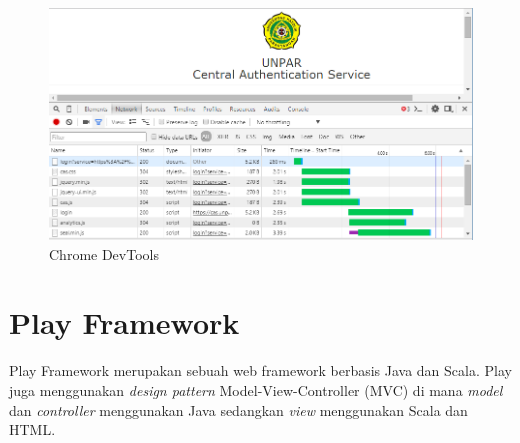 \begin{figure}[H]
	\centering
	\includegraphics[scale=0.5]{Gambar/chrome-devtools}
	\caption{Chrome DevTools} 
	\label{fig:chrome_devtools}
\end{figure}



\section{Play Framework}
\label{sec:play}

Play Framework \cite{Leroux:2014} merupakan sebuah web framework berbasis Java dan Scala. Play juga menggunakan \textit{design pattern} Model-View-Controller (MVC) di mana \textit{model} dan \textit{controller} menggunakan Java sedangkan \textit{view} menggunakan Scala dan HTML. 
